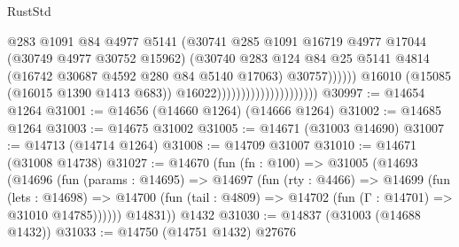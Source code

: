 \begin{lexlean}{RustStd}
\begin{coremodule}
                                                      @283
                                                      @1091
                                                      @84
                                                      @4977
                                                      @5141
                                                      (@30741
                                                        @285
                                                        @1091
                                                        @16719
                                                        @4977
                                                        @17044
                                                        (@30749 @4977 @30752 @15962)
                                                        (@30740
                                                          @283
                                                          @124
                                                          @84
                                                          @25
                                                          @5141
                                                          @4814
                                                          (@16742
                                                            @30687
                                                            @4592
                                                            @280
                                                            @84
                                                            @5140
                                                            @17063)
                                                          @30757))))))
                                              @16010
                                              (@15085 (@16015 @1390 @1413 @683))
                                              @16022)))))))))))))))))))))
@30997 := @14654 @1264
@31001 := @14656 (@14660 @1264) (@14666 @1264)
@31002 := @14685 @1264
@31003 := @14675 @31002
@31005 := @14671 (@31003 @14690)
@31007 := @14713 (@14714 @1264)
@31008 := @14709 @31007
@31010 := @14671 (@31008 @14738)
@31027 := @14670
    (fun (fn : @100) =>
    @31005
      (@14693
        (@14696
          (fun (params : @14695) =>
          @14697
            (fun (rty : @4466) =>
            @14699
              (fun (lets : @14698) =>
              @14700 (fun (tail : @4809) => @14702 (fun (Γ : @14701) => @31010 @14785))))))
        @14831))
    @1432
@31030 := @14837 (@31003 (@14688 @1432))
@31033 := @14750 (@14751 @1432) @27676

\end{coremodule}
\end{lexlean}
